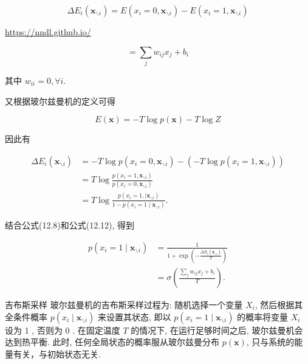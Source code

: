 \documentclass[10pt]{article}
\begin{document}
\begin{equation*}
\Delta E_{i}\left(\boldsymbol{x}_{\backslash i}\right)=E\left(x_{i}=0, \boldsymbol{x}_{\backslash i}\right)-E\left(x_{i}=1, \boldsymbol{x}_{\backslash i}\right) \tag{12.7}
\end{equation*}


\href{https://nndl.github.io/}{https://nndl.github.io/}


\begin{equation*}
=\sum_{j} w_{i j} x_{j}+b_{i} \tag{12.8}
\end{equation*}


其中 $w_{i i}=0, \forall i$.

又根据玻尔兹曼机的定义可得


\begin{equation*}
E(\boldsymbol{x})=-T \log p(\boldsymbol{x})-T \log Z \tag{12.9}
\end{equation*}


因此有


\begin{align*}
\Delta E_{i}\left(\boldsymbol{x}_{\backslash i}\right) & =-T \log p\left(x_{i}=0, \boldsymbol{x}_{\backslash i}\right)-\left(-T \log p\left(x_{i}=1, \boldsymbol{x}_{\backslash i}\right)\right)  \tag{12.10}\\
& =T \log \frac{p\left(x_{i}=1, \boldsymbol{x}_{\backslash i}\right)}{p\left(x_{i}=0, \boldsymbol{x}_{\backslash i}\right)}  \tag{12.11}\\
& =T \log \frac{p\left(x_{i}=1, \mid \boldsymbol{x}_{\backslash i}\right)}{1-p\left(x_{i}=1 \mid \boldsymbol{x}_{\backslash i}\right)} . \tag{12.12}
\end{align*}


结合公式(12.8)和公式(12.12), 得到


\begin{align*}
p\left(x_{i}=1 \mid \boldsymbol{x}_{\backslash i}\right) & =\frac{1}{1+\exp \left(-\frac{\Delta E_{i}\left(\boldsymbol{x}_{\backslash i}\right)}{T}\right)}  \tag{12.13}\\
& =\sigma\left(\frac{\sum_{j} w_{i j} x_{j}+b_{i}}{T}\right) . \tag{12.14}
\end{align*}


吉布斯采样 玻尔兹曼机的吉布斯采样过程为: 随机选择一个变量 $X_{i}$, 然后根据其全条件概率 $p\left(x_{i} \mid \boldsymbol{x}_{\backslash i}\right)$ 来设置其状态, 即以 $p\left(x_{i}=1 \mid \boldsymbol{x}_{\backslash i}\right)$ 的概率将变量 $X_{i}$ 设为 1 , 否则为 0 . 在固定温度 $T$ 的情况下, 在运行足够时间之后, 玻尔兹曼机会达到热平衡. 此时, 任何全局状态的概率服从玻尔兹曼分布 $p(\boldsymbol{x})$, 只与系统的能量有关，与初始状态无关.
\end{document}
